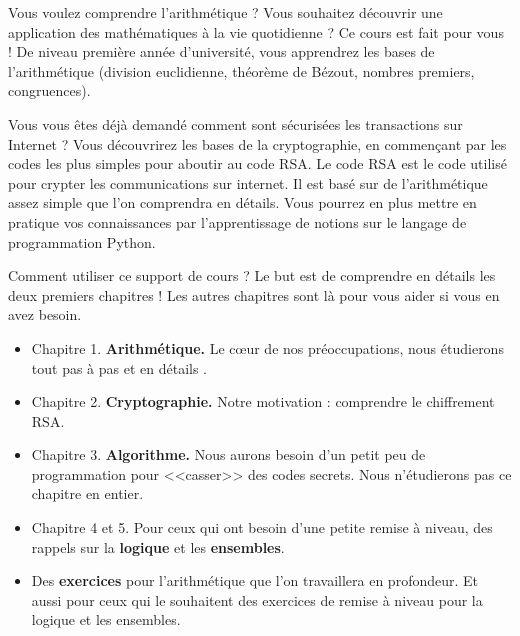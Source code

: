 \bigskip
\bigskip
{\sf
Vous voulez comprendre l'arithmétique ? Vous souhaitez découvrir 
une application des mathématiques à la vie quotidienne ? Ce cours 
est fait pour vous ! De niveau première année d'université, vous 
apprendrez les bases de l'arithmétique (division euclidienne, 
théorème de Bézout, nombres premiers, congruences). 

\bigskip

Vous vous êtes déjà demandé comment sont sécurisées les transactions sur Internet  ? 
Vous découvrirez les bases de la cryptographie, en commençant par 
les codes les plus simples pour aboutir au code RSA. Le code RSA 
est le code utilisé pour crypter les communications sur internet. 
Il est basé sur de l'arithmétique assez simple que l'on comprendra 
en détails. Vous pourrez en plus mettre en pratique vos connaissances par 
l'apprentissage de notions sur le langage de programmation Python.

\bigskip

Comment utiliser ce support de cours ? 
Le but est de comprendre en détails les deux premiers chapitres ! 
Les autres chapitres sont là pour vous aider si vous en avez besoin.

\begin{itemize}
  \item Chapitre 1. \textbf{\color{myred} Arithmétique.} Le c\oe ur de nos préoccupations, nous étudierons tout pas à pas et 
  en détails .
  
  \item Chapitre 2. \textbf{\color{myred} Cryptographie.} Notre motivation : comprendre le chiffrement RSA.
  
  \item Chapitre 3. \textbf{\color{myred} Algorithme.} Nous aurons besoin d'un petit peu 
  de programmation pour <<casser>> des codes secrets. Nous n'étudierons pas ce chapitre en entier.
  
  \item Chapitre 4 et  5. Pour ceux qui ont besoin d'une petite remise à niveau, 
  des rappels sur la \textbf{\color{myred} logique} et les \textbf{\color{myred} ensembles}.
  
  \item Des \textbf{\color{myred} exercices} pour l'arithmétique que l'on travaillera en profondeur.
  Et aussi pour ceux qui le souhaitent des exercices de remise à niveau pour la logique et les ensembles.
  
\end{itemize}


}
